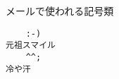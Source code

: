 \documentclass{jlreq}
\begin{document}
メールで使われる記号類
\begin{verbatim}
    :-)                                                                元祖スマイル
    ^^;                                                                冷や汗
\end{verbatim}
\end{document}
